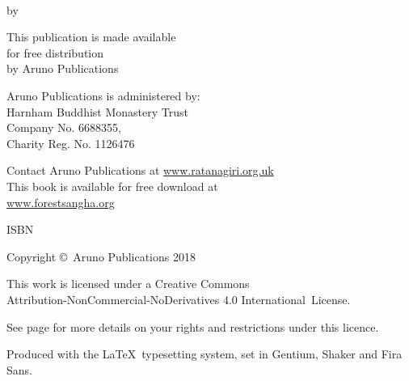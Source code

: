 \cleartoverso
\thispagestyle{empty}
\enlargethispage{\baselineskip}
\vspace*{-2\baselineskip}

{\copyrightsize
\raggedright
\setlength{\parindent}{0pt}%
\setlength{\parskip}{0.8\baselineskip}%

\thetitle\\
by \theauthor

This publication is made available\\
for free distribution\\
by Aruno Publications

Aruno Publications is administered by:\\
Harnham Buddhist Monastery Trust\\
Company No. 6688355,\\
Charity Reg. No. 1126476

Contact Aruno Publications at \href{https://ratanagiri.org.uk/}{www.ratanagiri.org.uk}\\
This book is available for free download at\\
\href{https://forestsangha.org}{www.forestsangha.org}

ISBN \theISBN

Copyright \copyright\ Aruno Publications 2018

\vfill

This work is licensed under a Creative Commons\\
Attribution-NonCommercial-NoDerivatives 4.0 International~License.

See page \pageref{copyright-details} for more details on your rights and restrictions under this licence.

Produced with the \LaTeX\ typesetting system, set in Gentium, Shaker and Fira Sans.

\theEditionInfo

}


